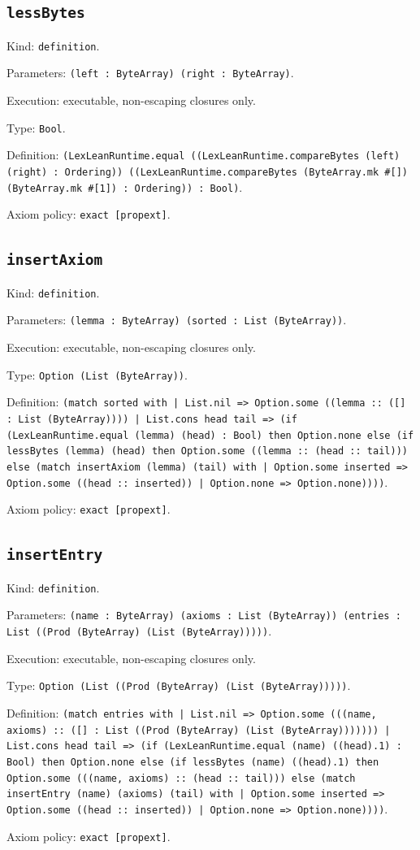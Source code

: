 \documentclass[11pt]{article}
\begin{document}
\subsection*{\texttt{lessBytes}}
\noindent Kind: \texttt{definition}.\par
\noindent Parameters: \texttt{(left : ByteArray) (right : ByteArray)}.\par
\noindent Execution: executable, non-escaping closures only.\par
\noindent Type: \texttt{Bool}.\par
\noindent Definition: \texttt{(LexLeanRuntime.equal ((LexLeanRuntime.compareBytes (left) (right) : Ordering)) ((LexLeanRuntime.compareBytes (ByteArray.mk \#[]) (ByteArray.mk \#[1]) : Ordering)) : Bool)}.\par
\noindent Axiom policy: \texttt{exact [propext]}.\par
\subsection*{\texttt{insertAxiom}}
\noindent Kind: \texttt{definition}.\par
\noindent Parameters: \texttt{(lemma : ByteArray) (sorted : List (ByteArray))}.\par
\noindent Execution: executable, non-escaping closures only.\par
\noindent Type: \texttt{Option (List (ByteArray))}.\par
\noindent Definition: \texttt{(match sorted with | List.nil => Option.some ((lemma :: ([] : List (ByteArray)))) | List.cons head tail => (if (LexLeanRuntime.equal (lemma) (head) : Bool) then Option.none else (if lessBytes (lemma) (head) then Option.some ((lemma :: (head :: tail))) else (match insertAxiom (lemma) (tail) with | Option.some inserted => Option.some ((head :: inserted)) | Option.none => Option.none))))}.\par
\noindent Axiom policy: \texttt{exact [propext]}.\par
\subsection*{\texttt{insertEntry}}
\noindent Kind: \texttt{definition}.\par
\noindent Parameters: \texttt{(name : ByteArray) (axioms : List (ByteArray)) (entries : List ((Prod (ByteArray) (List (ByteArray)))))}.\par
\noindent Execution: executable, non-escaping closures only.\par
\noindent Type: \texttt{Option (List ((Prod (ByteArray) (List (ByteArray)))))}.\par
\noindent Definition: \texttt{(match entries with | List.nil => Option.some (((name, axioms) :: ([] : List ((Prod (ByteArray) (List (ByteArray))))))) | List.cons head tail => (if (LexLeanRuntime.equal (name) ((head).1) : Bool) then Option.none else (if lessBytes (name) ((head).1) then Option.some (((name, axioms) :: (head :: tail))) else (match insertEntry (name) (axioms) (tail) with | Option.some inserted => Option.some ((head :: inserted)) | Option.none => Option.none))))}.\par
\noindent Axiom policy: \texttt{exact [propext]}.\par
\end{document}
